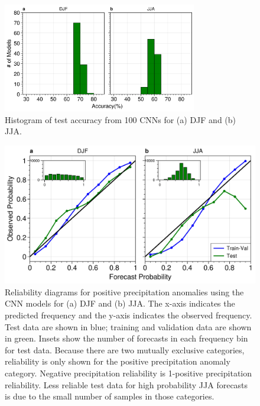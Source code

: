 \documentclass{ametsocV6.1}
\begin{document}
\begin{figure}[t]
  \noindent\includegraphics[width=20pc,angle=0]{Figure6.jpg}
  \caption{Histogram of test accuracy from 100 CNNs for (a) DJF and (b) JJA.}\label{f6}
\end{figure}


\begin{figure}[t]
  \noindent\includegraphics[width=35pc,angle=00]{Figure7.jpg}
  \caption{Reliability diagrams for positive precipitation anomalies using the CNN models for (a) DJF and (b) JJA.  The x-axis indicates the predicted frequency and the y-axis indicates the observed frequency. Test data are shown in blue; training and validation data are shown in green. Insets show the number of forecasts in each frequency bin for test data.  Because there are two mutually exclusive categories, reliability is only shown for the positive precipitation anomaly category.  Negative precipitation reliability is 1-positive precipitation reliability. Less reliable test data for high probability JJA forecasts is due to the small number of samples in those categories.}\label{f7}
\end{figure}
\end{document}
